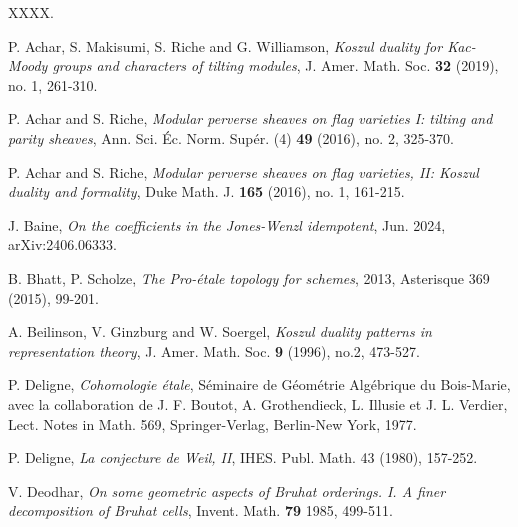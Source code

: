 \documentclass[11pt]{article}
\theoremstyle{remark}
\theoremstyle{definition}
\begin{document}


{\footnotesize
\begin{thebibliography}{XXXX.}


P. Achar, S. Makisumi, S. Riche and G. Williamson,
\emph{Koszul duality for Kac-Moody groups and characters of tilting modules},
J. Amer. Math. Soc. \textbf{32} (2019), no. 1, 261-310.

P. Achar and S. Riche,
\emph{Modular perverse sheaves on flag varieties I: tilting and parity sheaves},
Ann. Sci. \'{E}c. Norm. Sup\'{e}r. (4) \textbf{49} (2016), no. 2, 325-370.

P. Achar and S. Riche, 
\emph{Modular perverse sheaves on flag varieties, II: Koszul duality and formality},
Duke Math. J.  \textbf{165} (2016), no. 1, 161-215.

J. Baine, 
\emph{On the coefficients in the Jones-Wenzl idempotent}, 
Jun. 2024, arXiv:2406.06333.

B. Bhatt, P. Scholze,
\emph{The Pro-étale topology for schemes},
2013, Asterisque 369 (2015), 99-201.

A. Beilinson, V. Ginzburg and W. Soergel,
\emph{Koszul duality patterns in representation theory},
J. Amer. Math. Soc. \textbf{9} (1996), no.2, 473-527.

P. Deligne, 
\emph{Cohomologie \'{e}tale},
S\'{e}minaire de G\'{e}om\'{e}trie Alg\'{e}brique du Bois-Marie, avec la collaboration de J. F. Boutot, A. Grothendieck, L. Illusie et
J. L. Verdier, Lect. Notes in Math. 569, Springer-Verlag, Berlin-New York,
1977.

P. Deligne, 
\emph{La conjecture de Weil, II},
IHES. Publ. Math. 43 (1980), 157-252.

V. Deodhar,
\emph{On some geometric aspects of Bruhat orderings. I. A finer decomposition of Bruhat cells}, Invent. Math. \textbf{79} 1985, 499-511.


\end{thebibliography}}
\end{document}
